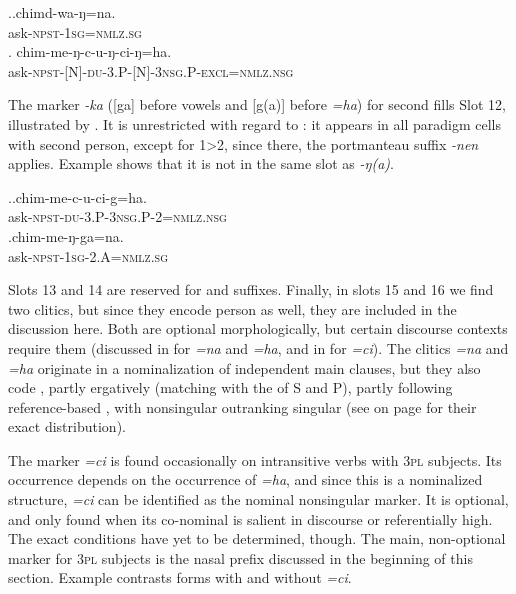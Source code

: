	\ex.\ag.chimd-wa-ŋ=na.\\
	ask{\scshape -npst-1sg=nmlz.sg}\\
	\bg. chim-me-ŋ-c-u-ŋ-ci-ŋ=ha.\\
	ask{\scshape -npst-[N]-du-3.P-[N]-3nsg.P-excl=nmlz.nsg}\\
		
		
The marker \emph{-ka} ([ga] before vowels and [g(a)] before \emph{=ha}) for second   fills Slot 12, illustrated by  \Next. It is unrestricted with regard to : it appears in all paradigm cells with second person, except for 1>2, since there, the portmanteau suffix \emph{-nen} applies. Example \Next[b] shows that it is not in the same slot as \emph{-ŋ(a)}.

\ex.\ag.chim-me-c-u-ci-g=ha.\\
	ask{\scshape -npst-du-3.P-3nsg.P-2=nmlz.nsg}\\
	\bg.chim-me-ŋ-ga=na.\\
	ask{\scshape -npst-1sg-2.A=nmlz.sg}\\
	
	
Slots 13 and 14 are reserved for  and  suffixes. Finally, in slots 15 and 16 we find two clitics, but since they encode person as well, they are included in the discussion here. Both are optional morphologically, but certain discourse contexts require them (discussed in  for \emph{=na} and \emph{=ha}, and in  for \emph{=ci}). The clitics \emph{=na} and \emph{=ha} originate in a nominalization of independent main clauses, but they also code , partly ergatively (matching with the  of S and P), partly following reference-based , with nonsingular outranking singular (see  on page \pageref{agr-tab} for their exact distribution).

The marker \emph{=ci} is found occasionally on intransitive verbs with {\scshape 3pl} subjects. Its occurrence depends on the occurrence of \emph{=ha}, and since this is a nominalized structure, \emph{=ci} can be identified as the nominal nonsingular marker.  It is optional, and only found when its co-nominal is salient in discourse or referentially high. The exact conditions have yet to be determined, though. The main, non-optional marker for {\scshape 3pl} subjects is the nasal prefix discussed in the beginning of this section. Example \Next contrasts forms with and without \emph{=ci}. 

